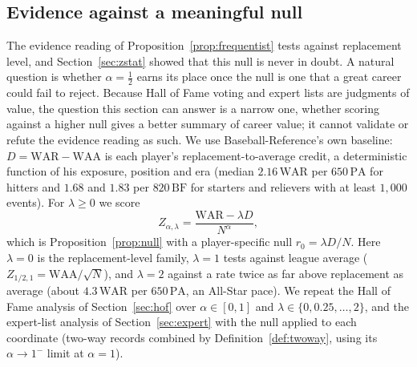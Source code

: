 \documentclass[11pt,letterpaper]{article}
\theoremstyle{plain}
\theoremstyle{definition}
\theoremstyle{remark}
\newcommand{\WAR}{\mathrm{WAR}}
\newcommand{\WAA}{\mathrm{WAA}}
\newcommand{\PA}{\mathrm{PA}}
\newcommand{\BF}{\mathrm{BF}}
\begin{document}
\subsection{Evidence against a meaningful null}
\label{sec:null}

The evidence reading of Proposition~\ref{prop:frequentist} tests against replacement level, and Section~\ref{sec:zstat} showed that this null is never in doubt. A natural question is whether $\alpha = \tfrac12$ earns its place once the null is one that a great career could fail to reject. Because Hall of Fame voting and expert lists are judgments of value, the question this section can answer is a narrow one, whether scoring against a higher null gives a better summary of career value; it cannot validate or refute the evidence reading as such. We use Baseball-Reference's own baseline: $D = \WAR - \WAA$ is each player's replacement-to-average credit, a deterministic function of his exposure, position and era (median $2.16\,\WAR$ per $650\,\PA$ for hitters and $1.68$ and $1.83$ per $820\,\BF$ for starters and relievers with at least $1{,}000$ events). For $\lambda \ge 0$ we score
\begin{equation}
    Z_{\alpha,\lambda} = \frac{\WAR - \lambda D}{N^{\alpha}},
\end{equation}
which is Proposition~\ref{prop:null} with a player-specific null $r_0 = \lambda D/N$. Here $\lambda = 0$ is the replacement-level family, $\lambda = 1$ tests against league average ($Z_{1/2,1} = \WAA/\sqrt N$), and $\lambda = 2$ against a rate twice as far above replacement as average (about $4.3\,\WAR$ per $650\,\PA$, an All-Star pace). We repeat the Hall of Fame analysis of Section~\ref{sec:hof} over $\alpha \in [0,1]$ and $\lambda \in \{0, 0.25, \ldots, 2\}$, and the expert-list analysis of Section~\ref{sec:expert} with the null applied to each coordinate (two-way records combined by Definition~\ref{def:twoway}, using its $\alpha \to 1^-$ limit at $\alpha = 1$).
\end{document}
